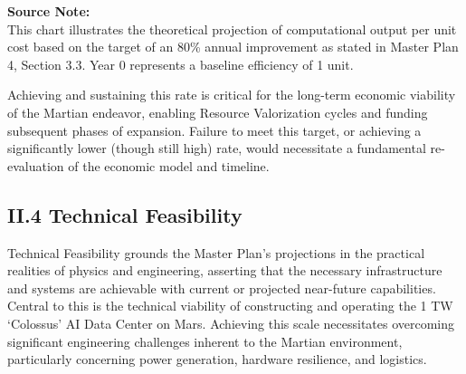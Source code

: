 \documentclass[fontsize=10pt, oneside, DIV=calc]{scrartcl}
\begin{document}
\noindent\footnotesize
\textbf{Source Note:}\\[0.5em]
This chart illustrates the theoretical projection of computational output per unit cost based on the target of an 80\% annual improvement as stated in Master Plan 4, Section 3.3. Year 0 represents a baseline efficiency of 1 unit.

\medskip

\noindent
Achieving and sustaining this rate is critical for the long-term economic viability of the Martian endeavor, enabling Resource Valorization cycles and funding subsequent phases of expansion. Failure to meet this target, or achieving a significantly lower (though still high) rate, would necessitate a fundamental re-evaluation of the economic model and timeline.



\subsection*{II.4 Technical Feasibility}



\medskip

\noindent
Technical Feasibility grounds the Master Plan's projections in the practical realities of physics and engineering, asserting that the necessary infrastructure and systems are achievable with current or projected near-future capabilities. Central to this is the technical viability of constructing and operating the 1 TW `Colossus' AI Data Center on Mars. Achieving this scale necessitates overcoming significant engineering challenges inherent to the Martian environment, particularly concerning power generation, hardware resilience, and logistics.
\end{document}
